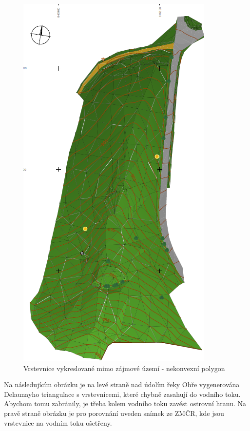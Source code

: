 \documentclass[11pt]{article}
\begin{document}
\begin{figure}[htbh]
	\includegraphics[scale=0.47]{images/chyba_nekonvex_spravne.png}
	\caption{Vrstevnice vykreslované mimo zájmové území - nekonvexní polygon}	
	\label{fig:nekonvex}
\end{figure} 
\FloatBarrier

Na následujícím obrázku je na levé straně nad údolím řeky Ohře vygenerována Delaunayho triangulace s vrstevnicemi, které chybně zasahují do vodního toku. Abychom tomu zabránily, je třeba kolem vodního toku zavést ostrovní hranu. Na pravě straně obrázku je pro porovnání uveden snímek ze ZMČR, kde jsou vrstevnice na vodním toku ošetřeny.

\clearpage
\end{document}
